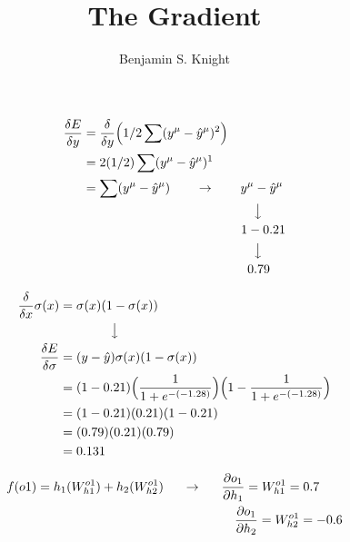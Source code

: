 \documentclass[]{article}
\title{The Gradient}
\author{Benjamin S. Knight}
\begin{document}
\maketitle
\begin{equation} \label{eq1}
\begin{split}
\displaystyle\frac{\delta E}{\delta y} & = \displaystyle\frac{\delta}{\delta y}\Big(1/2\sum(y^\mu - \hat{y}^\mu)^2\Big)\\
& = 2(1/2)\sum(y^\mu - \hat{y}^\mu)^1\\
& = \sum(y^\mu - \hat{y}^\mu) \text{\phantom{aaaa}} \rightarrow \text{\phantom{aaaa}} y^\mu - \hat{y}^\mu \\
& \text{\phantom{aaaaaaaaaaaaaaaaaaaaaaaaaaa}} \big\downarrow\\
& \text{\phantom{aaaaaaaaaaaaaaaaaaaaaaaaa}} 1 - 0.21\\
& \text{\phantom{aaaaaaaaaaaaaaaaaaaaaaaaaaa}} \big\downarrow\\
& \text{\phantom{aaaaaaaaaaaaaaaaaaaaaaaaaa}} 0.79
\end{split}
\end{equation}

\begin{equation} \label{eq1}
\begin{split}
\displaystyle\frac{\delta}{\delta x}\sigma(x) & = \sigma(x)(1 - \sigma(x))\\
 & \text{\phantom{aaaaaaaa}} \big\downarrow \\
\displaystyle\frac{\delta E}{\delta \sigma} & = (y - \hat{y})\sigma(x)(1 - \sigma(x))\\
& = (1 - 0.21)\Big(\displaystyle\frac{1}{1 + e^{-(-1.28)}}\Big)\Big(1 - \displaystyle\frac{1}{1 + e^{-(-1.28)}}\Big)\\
& = (1 - 0.21)(0.21)(1 - 0.21)\\
& = (0.79)(0.21)(0.79)\\
& = 0.131\\
\end{split}
\end{equation}




\begin{equation} \label{eq1}
\begin{split}
f(o1) & = h_1(W_{h1}^{o1}) + h_2(W_{h2}^{o1}) \text{\phantom{aaa}} \rightarrow \text{\phantom{aaa}} \displaystyle\frac{\partial o_1}{\partial h_1} = W_{h1}^{o1} = 0.7  \\
& \text{\phantom{||||aaaaaaaaaaaaaaaaaaaaaaaaaaaaa}} \displaystyle\frac{\partial o_1}{\partial h_2} = W_{h2}^{o1} = -0.6
\end{split}
\end{equation}
\end{document}
